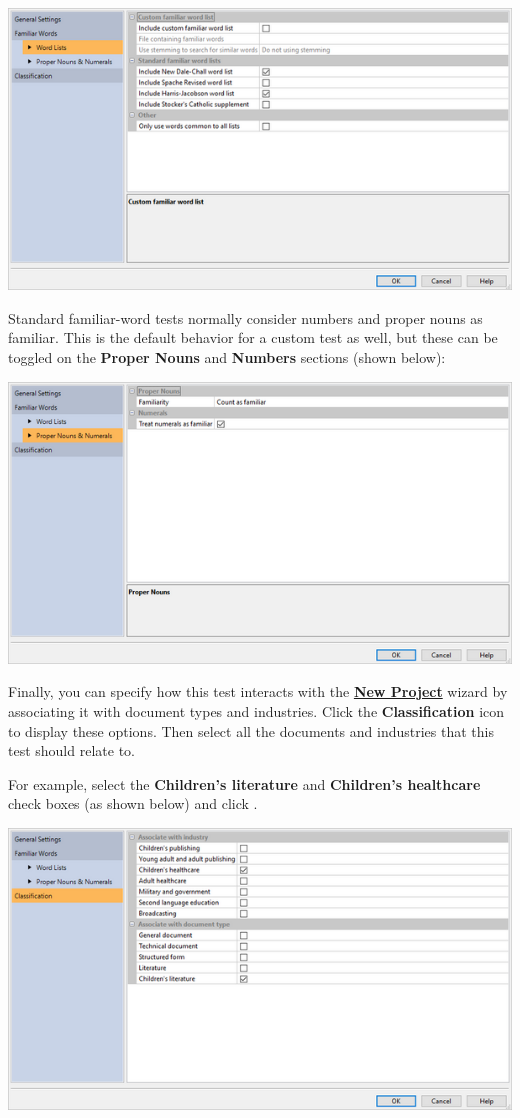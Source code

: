 \documentclass[
]{book}
\theoremstyle{definition}
\theoremstyle{definition}
\theoremstyle{definition}
\theoremstyle{definition}
\theoremstyle{remark}
\begin{document}
\includegraphics{Images/CustomTestIncludeLists.png}

Standard familiar-word tests normally consider numbers and proper nouns as familiar. This is the default behavior for a custom test as well, but these can be toggled on the \textbf{Proper Nouns} and \textbf{Numbers} sections (shown below):

\includegraphics{Images/CustomTestTreat.png}

Finally, you can specify how this test interacts with the \protect\hyperlink{creating-standard-project}{\textbf{New Project}} wizard by associating it with document types and industries. Click the \textbf{Classification} icon to display these options. Then select all the documents and industries that this test should relate to.

For example, select the \textbf{Children's literature} and \textbf{Children's healthcare} check boxes (as shown below) and click .

\includegraphics{Images/CustomTestWizardSettings.png}
\end{document}
